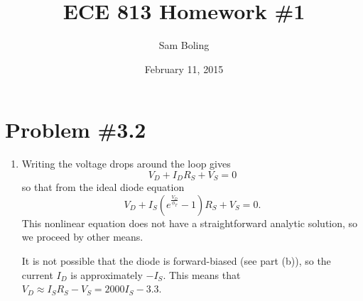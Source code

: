 \documentclass{article}
\title{ECE 813 Homework \#1}
\author{Sam Boling}
\date{February 11, 2015}
\begin{document}
\maketitle

\section*{Problem \#3.2}

\begin{enumerate}[label=(\alph*)]
  \item{
    Writing the voltage drops around the loop gives
    $$
    V_D + I_D R_S + V_S = 0
    $$
    so that from the ideal diode equation
    $$
    V_D + I_S (e^{\frac{V_D}{\phi_T}} - 1)R_S + V_S = 0.
    $$
    This nonlinear equation does not have a straightforward analytic
    solution, so we proceed by other means.

    It is not possible that the diode is forward-biased (see part
    (b)), so the current $I_D$ is approximately $-I_S$. This means
    that $V_D \approx I_S R_S - V_S = 2000 I_S - 3.3$.

}
\end{enumerate}
\end{document}
